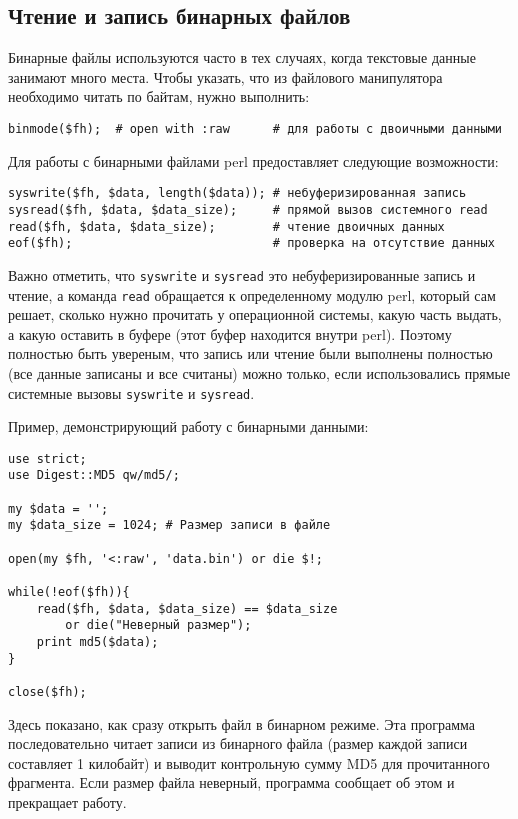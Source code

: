 \subsection{Чтение и запись бинарных файлов}
Бинарные файлы используются часто в тех случаях, когда текстовые данные занимают много места. Чтобы указать, что из файлового манипулятора необходимо читать по байтам, нужно выполнить:
\begin{verbatim}
binmode($fh);  # open with :raw      # для работы с двоичными данными
\end{verbatim}
Для работы с бинарными файлами perl предоставляет следующие возможности:
\begin{verbatim}
syswrite($fh, $data, length($data)); # небуферизированная запись
sysread($fh, $data, $data_size);     # прямой вызов системного read
read($fh, $data, $data_size);        # чтение двоичных данных
eof($fh);                            # проверка на отсутствие данных
\end{verbatim}
Важно отметить, что \verb|syswrite| и \verb|sysread| это небуферизированные запись и чтение, а команда \verb|read| обращается к определенному модулю perl, который сам решает, сколько нужно прочитать у операционной системы, какую часть выдать, а какую оставить в буфере (этот буфер находится внутри perl). Поэтому полностью быть увереным, что запись или чтение были выполнены полностью (все данные записаны и все считаны) можно только, если использовались прямые системные вызовы \verb|syswrite| и \verb|sysread|.

Пример, демонстрирующий работу с бинарными данными:
\begin{verbatim}
use strict;
use Digest::MD5 qw/md5/;

my $data = '';
my $data_size = 1024; # Размер записи в файле

open(my $fh, '<:raw', 'data.bin') or die $!;

while(!eof($fh)){
    read($fh, $data, $data_size) == $data_size
        or die("Неверный размер");
    print md5($data);
}

close($fh);
\end{verbatim}
Здесь показано, как сразу открыть файл в бинарном режиме. Эта программа последовательно читает записи из бинарного файла (размер каждой записи составляет 1 килобайт) и выводит контрольную сумму MD5 для прочитанного фрагмента. Если размер файла неверный, программа сообщает об этом и прекращает работу.


